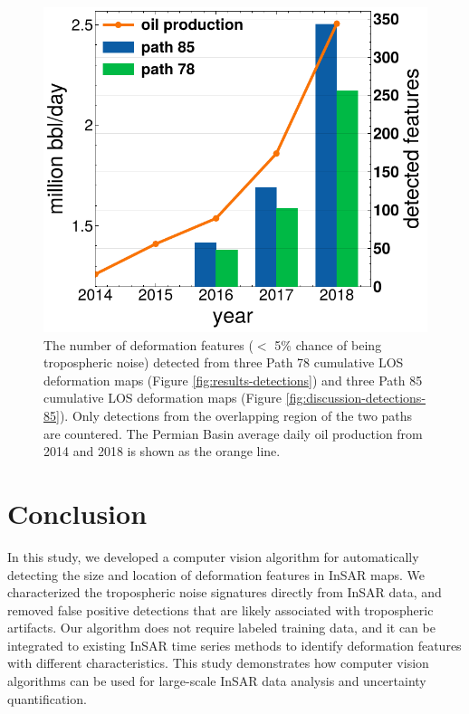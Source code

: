 \begin{figure}[hbt!]
	\centering 
	\includegraphics[width=0.98\linewidth]{paper2/figures/figure_discussion_oil_vs_blob_count.pdf}
	\caption[Number of detected deformation figures and yearly oil production]{
		The number of deformation features ($<$ 5\% chance of being tropospheric noise) detected from three Path 78 cumulative LOS deformation maps (Figure \ref{fig:results-detections}) and three Path 85 cumulative LOS deformation maps (Figure \ref{fig:discussion-detections-85}). Only detections from the overlapping region of the two paths are countered. The Permian Basin average daily oil production from 2014 and 2018 is shown as the orange line.
	}
	\label{fig:discussion-oil-blob-count}
\end{figure}



\section{Conclusion}


In this study, we developed a computer vision algorithm for automatically detecting the size and location of deformation features in InSAR maps. We characterized the tropospheric noise signatures directly from InSAR data, and removed false positive detections that are likely associated with  tropospheric artifacts. Our algorithm does not require labeled training data, and it can be integrated to existing InSAR time series methods to identify deformation features with different characteristics. This study demonstrates how computer vision algorithms can be used for large-scale InSAR data analysis and uncertainty quantification.


	
